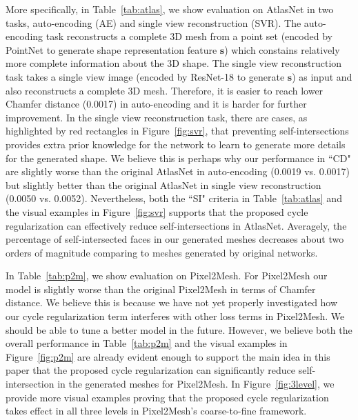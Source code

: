 More specifically, in Table~\ref{tab:atlas}, we show evaluation on AtlasNet in two tasks, auto-encoding (AE) and single view reconstruction (SVR). The auto-encoding task reconstructs a complete 3D mesh from a point set (encoded by PointNet \cite{pointnet} to generate shape representation feature $\mathbf{s}$) which constains relatively more complete information about the 3D shape. The single view reconstruction task takes a single view image (encoded by ResNet-18 \cite{resnet} to generate $\mathbf{s}$) as input and also reconstructs a complete 3D mesh. Therefore, it is easier to reach lower Chamfer distance (0.0017) in auto-encoding and it is harder for further improvement.  In the single view reconstruction task, there are cases, as highlighted by red rectangles in Figure~\ref{fig:svr}, that preventing self-intersections provides extra prior knowledge for the network to learn to generate more details for the generated shape. We believe this is perhaps why our performance in ``CD"  are slightly worse than the original AtlasNet in auto-encoding (0.0019 vs. 0.0017) but slightly better than the original AtlasNet in single view reconstruction (0.0050 vs. 0.0052). Nevertheless, both the ``SI" criteria in Table~\ref{tab:atlas} and the visual examples in Figure~\ref{fig:svr} supports that the proposed cycle regularization can effectively reduce self-intersections in AtlasNet. Averagely, the percentage of self-intersected faces in our generated meshes decreases about two orders of magnitude comparing to meshes generated by original networks.

In Table~\ref{tab:p2m}, we show evaluation on Pixel2Mesh. For Pixel2Mesh our model is slightly worse than the original Pixel2Mesh in terms of Chamfer distance. We believe this is because we have not yet properly investigated how our cycle regularization term interferes with other loss terms in Pixel2Mesh. We should be able to tune a better model in the future. However, we believe both the overall performance in Table~\ref{tab:p2m} and the visual examples in Figure~\ref{fig:p2m} are already evident enough to support the main idea in this paper that the proposed cycle regularization can significantly reduce self-intersection in the generated meshes for Pixel2Mesh. In Figure~\ref{fig:3level}, we provide more visual examples proving that the proposed cycle regularization takes effect in all three levels in Pixel2Mesh's coarse-to-fine framework.

